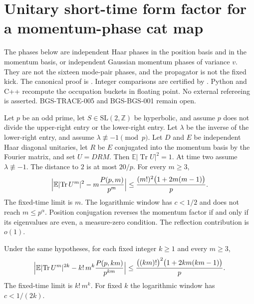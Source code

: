 \section{Unitary short-time form factor for a momentum-phase cat map}
\label{sec:momentum-phase-cue}
The phases below are independent Haar phases in the position basis and in the
momentum basis, or independent Gaussian momentum phases of variance \(v\).
They are not the sixteen mode-pair phases, and the propagator is not the fixed kick.
The canonical proof is
.
Integer comparisons are certified by
.
Python and C++ recompute the occupation buckets in floating point. No external refereeing is asserted.
BGS-TRACE-005 and BGS-BGS-001 remain open.

\begin{theorem}
\label{thm:momentum-phase-cue}
Let \(p\) be an odd prime, let \(S\in\mathrm{SL}(2,\mathbb Z)\) be hyperbolic, and assume \(p\) does not divide the upper-right entry or the lower-right entry. Let \(\lambda\) be the inverse of the lower-right entry, and assume \(\lambda\not\equiv -1\pmod p\). Let \(D\) and \(E\) be independent Haar diagonal unitaries, let \(R\) be \(E\) conjugated into the momentum basis by the Fourier matrix, and set \(U=DRM\). Then \(\mathbb E\lvert\operatorname{Tr} U\rvert^2=1\). At time two assume \(\lambda\not\equiv-1\). The distance to \(2\) is at most \(20/p\). For every \(m\ge 3\),
\[
\Bigl\lvert\mathbb E\lvert\operatorname{Tr} U^m\rvert^2
-m\frac{P(p,m)}{p^m}\Bigr\rvert
\le\frac{(m!)^2\bigl(1+2m(m-1)\bigr)}{p}.
\]
The fixed-time limit is \(m\). The logarithmic window has \(c<1/2\) and does not reach \(m\le p^{\alpha}\). Position conjugation reverses the momentum factor if and only if its eigenvalues are even, a measure-zero condition. The reflection contribution is \(o(1)\).
\end{theorem}

\begin{theorem}
\label{thm:momentum-phase-moments}
Under the same hypotheses, for each fixed integer \(k\ge 1\) and every \(m\ge 3\),
\[
\Bigl\lvert\mathbb E\lvert\operatorname{Tr} U^m\rvert^{2k}
-k!\,m^k\frac{P(p,km)}{p^{km}}\Bigr\rvert
\le\frac{\bigl((km)!\bigr)^2\bigl(1+2km(km-1)\bigr)}{p}.
\]
The fixed-time limit is \(k!\,m^k\). For fixed \(k\) the logarithmic window has \(c<1/(2k)\).
\end{theorem}


